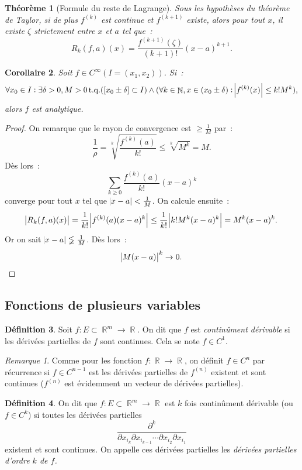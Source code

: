 \documentclass{article}
\DeclareMathOperator{\N}{\mathbb N}
\DeclareMathOperator{\R}{\mathbb R}
\DeclareMathOperator{\tq}{ t.q. }
\newtheorem{thm}{Théorème}[section]
\newtheorem{cor}[thm]{Corollaire}
\theoremstyle{definition}
\newtheorem{déf}[thm]{Définition}
\theoremstyle{remark}
\newtheorem*{rmq}{Remarque}
\begin{document}
		\begin{thm}[Formule du reste de Lagrange] Sous les hypothèses du théorème de Taylor, si de plus $f^{(k)}$ est continue et $f^{(k+1)}$ existe, alors
		pour tout $x$, il existe $\zeta$ strictement entre $x$ et $a$ tel que~:
		\[R_k(f, a)(x) = \frac {f^{(k+1)}(\zeta)}{(k+1)!}(x-a)^{k+1}.\]
		\end{thm}

		\begin{cor} Soit $f \in C^\infty(I=(x_1, x_2))$. Si~:
		\[\forall x_0 \in I : \exists \delta > 0, M > 0 \tq ([x_0 \pm \delta] \subset I) \land (\forall k \in \N, x \in (x_0 \pm \delta) : \abs {f^{(k)}(x)} \leq k!M^k),\]
		alors $f$ est analytique.
		\end{cor}

		\begin{proof} On remarque que le rayon de convergence est $\geq \frac 1M$ par~:
		\[\frac 1\rho = \sqrt[k] {\frac {f^{(k)}(a)}{k!}} \leq \sqrt[k] {M^k} = M.\]
		Dès lors~:
		\[\sum_{k \geq 0}\frac {f^{(k)}(a)}{k!}(x-a)^k\]
		converge pour tout $x$ tel que $\abs {x-a} < \frac 1M$. On calcule ensuite~:
		\[\abs {R_k(f, a)(x)} = \frac 1{k!}\abs {f^{(k)}(a)(x-a)^k} \leq \frac 1{k!}\abs {k!M^k(x-a)^k} = M^k(x-a)^k.\]
		Or on sait $\abs {x-a} \lneqq \frac 1M$. Dès lors~:
		\[\abs {M(x-a)}^k \to 0.\]
		\end{proof}

	\subsection{Fonctions de plusieurs variables}
		\begin{déf} Soit $f : E \subset \R^m \to \R$. On dit que $f$ est \emph{continûment dérivable} si les dérivées partielles de $f$ sont continues.
		Cela se note $f \in C^1$.
		\end{déf}

		\begin{rmq} Comme pour les fonction $f : \R \to \R$, on définit $f \in C^n$ par récurrence si $f \in C^{n-1}$ est les dérivées partielles de $f^{(n)}$
		existent et sont continues ($f^{(n)}$ est évidemment un vecteur de dérivées partielles).
		\end{rmq}

		\begin{déf} On dit que $f : E \subset \R^m \to \R$ est $k$ fois continûment dérivable (ou $f \in C^k$) si toutes les dérivées partielles~
		\[\frac {\partial^k}{\partial x_{i_k}\partial x_{i_{k-1}}\dotsb\partial x_{i_2}\partial x_{i_1}}\]
		existent et sont continues. On appelle ces dérivées partielles les \emph{dérivées partielles d'ordre $k$ de $f$.}
		\end{déf}
\end{document}
